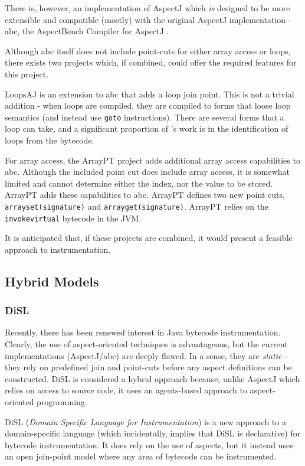 		There is, however, an implementation of AspectJ which \emph{is} designed to be more extensible and compatible (mostly) with the original AspectJ implementation - abc, the AspectBench Compiler for AspectJ \citep{Allan2005}.
		
		Although abc itself does not include point-cuts for either array access or loops, there exists two projects which, if combined, could offer the required features for this project.
		
		LoopsAJ \citep{Harbulot2005} is an extension to abc that adds a loop join point. This is not a trivial addition - when loops are compiled, they are compiled to forms that loose loop semantics (and instead use \texttt{goto} instructions). There are several forms that a loop can take, and a significant proportion of \citeauthor{Harbulot2005}'s work is in the identification of loops from the bytecode.
				
		For array access, the ArrayPT project \citep{Chen2007} adds additional array access capabilities to abc. Although the included point cut does include array access, it is somewhat limited and cannot determine either the index, nor the value to be stored. ArrayPT adds these capabilities to abc. ArrayPT defines two new point cuts, \texttt{arrayset(signature)} and \texttt{arrayget(signature)}. ArrayPT relies on the \texttt{invokevirtual} bytecode in the JVM.
		
		It is anticipated that, if these projects are combined, it would present a feasible approach to instrumentation.

	\subsection{Hybrid Models} \label{sec:instrumentation/hybrid}
		\subsubsection{DiSL} \label{sec:instrumentation/hybrid/disl}
		Recently, there has been renewed interest in Java bytecode instrumentation. Clearly, the use of aspect-oriented techniques is advantageous, but the current implementations (AspectJ/abc) are deeply flawed. In a sense, they are \textit{static} - they rely on predefined join and point-cuts before any aspect definitions can be constructed. DiSL is considered a hybrid approach because, unlike AspectJ which relies on access to source code, it uses an agents-based approach to aspect-oriented programming.
		
		DiSL (\textit{Domain Specific Language for Instrumentation}) \citep{Marek2012} is a new approach to a domain-specific language (which incidentally, implies that DiSL is declarative) for bytecode instrumentation. It does rely on the use of aspects, but it instead uses an open join-point model where any area of bytecode can be instrumented.
		
